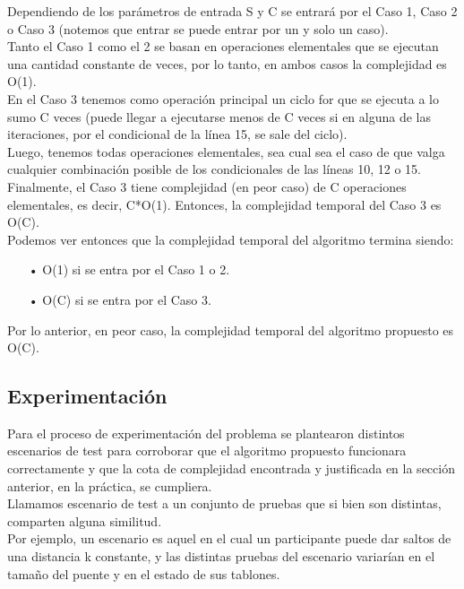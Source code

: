 \noindent Dependiendo de los par\'ametros de entrada S y C se entrar\'a por el Caso 1, Caso 2 o Caso 3 (notemos que entrar se puede entrar por un y solo un caso).\\
Tanto el Caso 1 como el 2 se basan en operaciones elementales que se ejecutan una cantidad constante de veces, por lo tanto, en ambos casos la complejidad es O(1).\\
En el Caso 3 tenemos como operaci\'on principal un ciclo for que se ejecuta a lo sumo C veces (puede llegar a ejecutarse menos de C veces si en alguna de las iteraciones, por el condicional de la l\'inea 15, se sale del ciclo).\\
Luego, tenemos todas operaciones elementales, sea cual sea el caso de que valga cualquier combinaci\'on posible de los condicionales de las l\'ineas 10, 12 o 15.\\
Finalmente, el Caso 3 tiene complejidad (en peor caso) de C operaciones elementales, es decir, C*O(1). Entonces, la complejidad temporal del Caso 3 es O(C).\\
Podemos ver entonces que la complejidad temporal del algoritmo termina siendo:\\
\begin{itemize}
\item[•]O(1) si se entra por el Caso 1 o 2.
\item[•]O(C) si se entra por el Caso 3.\\
\end{itemize}
Por lo anterior, en peor caso, la complejidad temporal del algoritmo propuesto es O(C).\newpage

\subsection{Experimentación}
\noindent Para el proceso de experimentación del problema se plantearon distintos escenarios de test para corroborar que el algoritmo propuesto funcionara correctamente y que la cota de complejidad encontrada y justificada en la sección anterior, en la práctica, se cumpliera.\\

\noindent Llamamos escenario de test a un conjunto de pruebas que si bien son distintas, comparten alguna similitud.\\

\noindent Por ejemplo, un escenario es aquel en el cual un participante puede dar saltos de una distancia k constante, y las distintas pruebas del escenario variarían en el tamaño del puente y en el estado de sus tablones.\\

